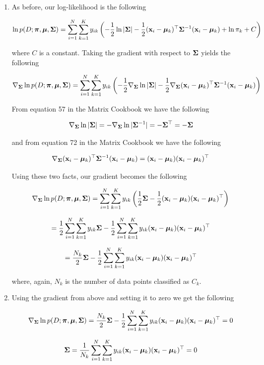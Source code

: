 \documentclass[submit]{harvardml}
\begin{document}
\begin{enumerate}
\item 

As before, our log-likelihood is the following

$$ \ln p(D; \boldsymbol{\pi}, \boldsymbol{\mu}, \mathbf{\Sigma}) = \sum_{i=1}^N \sum_{k=1}^K  y_{ik} \left(  -\frac{1}{2} \ln |\mathbf{\Sigma}| - \frac{1}{2} (\mathbf{x}_i - \boldsymbol{\mu}_k)^\top \mathbf{\Sigma}^{-1} (\mathbf{x}_i - \boldsymbol{\mu}_k) + \ln \pi_k + C\right) $$ 

where $C$ is a constant. Taking the gradient with respect to $\mathbf{\Sigma}$ yields the following

$$ \nabla_{\mathbf{\Sigma}} \ln p(D; \boldsymbol{\pi}, \boldsymbol{\mu}, \mathbf{\Sigma}) = \sum_{i=1}^N \sum_{k=1}^K  y_{ik} \left(  -\frac{1}{2} \nabla_{\mathbf{\Sigma}} \ln |\mathbf{\Sigma}| - \frac{1}{2} \nabla_{\mathbf{\Sigma}} (\mathbf{x}_i - \boldsymbol{\mu}_k)^\top \mathbf{\Sigma}^{-1} (\mathbf{x}_i - \boldsymbol{\mu}_k) \right) $$ 

From equation 57 in the Matrix Cookbook we have the following

$$  \nabla_{\mathbf{\Sigma}} \ln |\mathbf{\Sigma}| =  -\nabla_{\mathbf{\Sigma}} \ln |\mathbf{\Sigma}^{-1}| =  -\mathbf{\Sigma}^{\top} = -\mathbf{\Sigma} $$

and from equation 72 in the Matrix Cookbook we have the following

$$ \nabla_{\mathbf{\Sigma}} (\mathbf{x}_i - \boldsymbol{\mu}_k)^\top \mathbf{\Sigma}^{-1} (\mathbf{x}_i - \boldsymbol{\mu}_k) = (\mathbf{x}_i - \boldsymbol{\mu}_k) (\mathbf{x}_i - \boldsymbol{\mu}_k) ^\top  $$

Using these two facts, our gradient becomes the following

$$ \nabla_{\mathbf{\Sigma}} \ln p(D; \boldsymbol{\pi}, \boldsymbol{\mu}, \mathbf{\Sigma}) = \sum_{i=1}^N \sum_{k=1}^K  y_{ik} \left(  \frac{1}{2} \mathbf{\Sigma}  - \frac{1}{2} (\mathbf{x}_i - \boldsymbol{\mu}_k)(\mathbf{x}_i - \boldsymbol{\mu}_k)^{\top} \right) $$ 

$$ =  \frac{1}{2} \sum_{i=1}^N \sum_{k=1}^K y_{ik} \mathbf{\Sigma}  - \frac{1}{2} \sum_{i=1}^N \sum_{k=1}^K y_{ik} (\mathbf{x}_i - \boldsymbol{\mu}_k)(\mathbf{x}_i - \boldsymbol{\mu}_k)^{\top}  $$

$$ =  \frac{N_k}{2} \mathbf{\Sigma}  - \frac{1}{2} \sum_{i=1}^N \sum_{k=1}^K y_{ik} (\mathbf{x}_i - \boldsymbol{\mu}_k)(\mathbf{x}_i - \boldsymbol{\mu}_k)^{\top}  $$

where, again, $N_k$ is the number of data points classified as $C_k$.

\item 

Using the gradient from above and setting it to zero we get the following

$$\nabla_{\mathbf{\Sigma}} \ln p(D; \boldsymbol{\pi}, \boldsymbol{\mu}, \mathbf{\Sigma}) =  \frac{N_k}{2} \mathbf{\Sigma}  - \frac{1}{2} \sum_{i=1}^N \sum_{k=1}^K y_{ik} (\mathbf{x}_i - \boldsymbol{\mu}_k)(\mathbf{x}_i - \boldsymbol{\mu}_k)^{\top} = 0$$

$$ \mathbf{\Sigma} = \frac{1}{N_k} \sum_{i=1}^N \sum_{k=1}^K y_{ik} (\mathbf{x}_i - \boldsymbol{\mu}_k)(\mathbf{x}_i - \boldsymbol{\mu}_k)^{\top} = 0$$

\end{enumerate}
\end{document}
